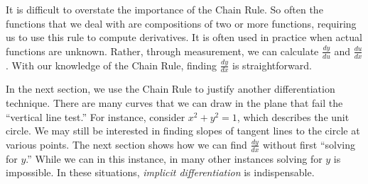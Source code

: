 It is difficult to overstate the importance of the Chain Rule. So often the functions that we deal with are compositions of two or more functions, requiring us to use this rule to compute derivatives. It is often used in practice when actual functions are unknown. Rather, through measurement, we can calculate $\frac{dy}{du}$ and $\frac{du}{dx}$. With our knowledge of the Chain Rule, finding $\frac{dy}{dx}$ is straightforward. 

In the next section, we use the Chain Rule to justify another differentiation technique. There are many curves that we can draw in the plane that fail the ``vertical line test.'' For instance, consider $x^2+y^2=1$, which describes the unit circle. We may still be interested in finding slopes of tangent lines to the circle at various points. The next section shows how we can find $\frac{dy}{dx}$ without first ``solving for $y$.'' While we can in this instance, in many other instances solving for $y$ is impossible. In these situations, \emph{implicit differentiation} is indispensable. 



